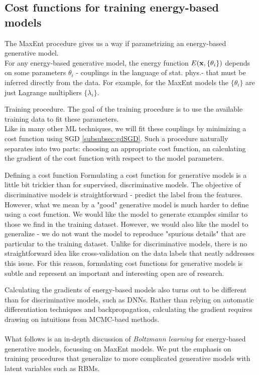 \subsection{Cost functions for training energy-based models}
\label{subsec:energyCostfctHowTo}
The MaxEnt procedure gives us a way if parametrizing an energy-based generative model.\\
	For any energy-based generative model, the energy function $E(\mathbf{x},\{\theta_i\} )$ depends on some parameters $\theta_i$ - couplings in the language of stat. phys.- that must be inferred directly from the data. For example, for the MaxEnt models the $\{\theta_i\}$ are just Lagrange multipliers $\{\lambda_i\}$. 
\begin{mybox}{Training procedure.}
The goal of the training procedure is to use the available training data to fit these parameters.\\
	Like in many other ML techniques, we will fit these couplings by minimizing a cost function using SGD \ref{subsubsec:gdSGD}. Such a procedure naturally separates into two parts: choosing an appropriate cost function, an calculating the gradient of the cost function with respect to the model parameters.
\end{mybox}
\begin{mybox}{Defining a cost function}
	 Formulating a cost function for generative models is a little bit trickier than for supervised, discriminative models. The objective of discriminative models is straightforward - predict the label from the features. However, what we mean by a "good" generative model is much harder to define using a cost function. We would like the model to generate examples similar to those we find in the training dataset. However, we would also like the model to generalize - we do not want the model to reproduce "spurious details" that are particular to the training dataset. Unlike for discriminative models, there is no straightforward idea like cross-validation on the data labels that neatly addresses this issue. For this reason, formulating cost functions for generative models is subtle and represent an important and interesting open are of research.
\end{mybox}
Calculating the gradients of energy-based models also turns out to be different than for discriminative models, such as DNNs. Rather than relying on automatic differentiation techniques and backpropagation, calculating the gradient requires drawing on intuitions from MCMC-baed methods.\\
\\
What follows is an in-depth discussion of \emph{Boltzmann learning} for energy-based generative models, focussing on MaxEnt models. We put the emphasis on training procedures that generalize to more complicated generative models with latent variables such as RBMs.






